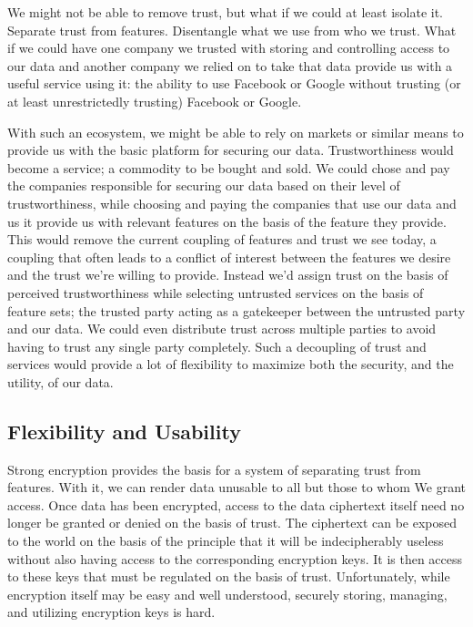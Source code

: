 We might not be able to remove trust, but what if we could at least
isolate it. Separate trust from features. Disentangle what we use from
who we trust. What if we could have one company we trusted with
storing and controlling access to our data and another company we
relied on to take that data provide us with a useful service using it:
the ability to use Facebook or Google without trusting (or at least
unrestrictedly trusting) Facebook or Google.

With such an ecosystem, we might be able to rely on markets or similar
means to provide us with the basic platform for securing our
data. Trustworthiness would become a service; a commodity to be bought
and sold. We could chose and pay the companies responsible for
securing our data based on their level of trustworthiness, while
choosing and paying the companies that use our data and us it provide
us with relevant features on the basis of the feature they
provide. This would remove the current coupling of features and trust
we see today, a coupling that often leads to a conflict of interest
between the features we desire and the trust we're willing to
provide. Instead we'd assign trust on the basis of perceived
trustworthiness while selecting untrusted services on the basis of
feature sets; the trusted party acting as a gatekeeper between the
untrusted party and our data. We could even distribute trust across
multiple parties to avoid having to trust any single party
completely. Such a decoupling of trust and services would provide a
lot of flexibility to maximize both the security, and the utility, of
our data.

\subsection{Flexibility and Usability}

Strong encryption provides the basis for a system of separating trust
from features. With it, we can render data unusable to all but those
to whom We grant access. Once data has been encrypted, access to the
data ciphertext itself need no longer be granted or denied on the
basis of trust. The ciphertext can be exposed to the world on the
basis of the principle that it will be indecipherably useless without
also having access to the corresponding encryption keys. It is then
access to these keys that must be regulated on the basis of
trust. Unfortunately, while encryption itself may be easy and well
understood, securely storing, managing, and utilizing encryption keys
is hard.

